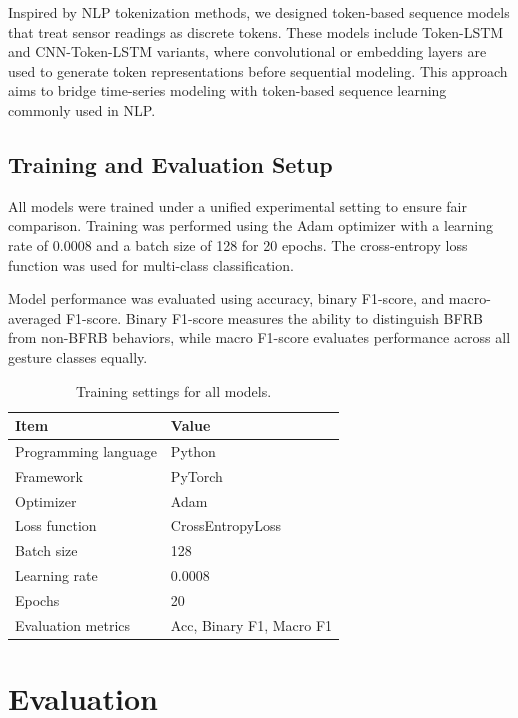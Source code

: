 \documentclass[conference]{IEEEtran}
\begin{document}
Inspired by NLP tokenization methods, we designed token-based sequence models that treat sensor readings as discrete tokens. These models include Token-LSTM and CNN-Token-LSTM variants, where convolutional or embedding layers are used to generate token representations before sequential modeling. This approach aims to bridge time-series modeling with token-based sequence learning commonly used in NLP.

\subsection{Training and Evaluation Setup}

All models were trained under a unified experimental setting to ensure fair comparison. Training was performed using the Adam optimizer with a learning rate of 0.0008 and a batch size of 128 for 20 epochs. The cross-entropy loss function was used for multi-class classification.

Model performance was evaluated using accuracy, binary F1-score, and macro-averaged F1-score. Binary F1-score measures the ability to distinguish BFRB from non-BFRB behaviors, while macro F1-score evaluates performance across all gesture classes equally.

\begin{table}[t]
\caption{Training settings for all models.}
\label{tab:training_setting}
\centering
\begin{tabular}{ll}
\hline
Item & Value \\
\hline
Programming language & Python \\
Framework & PyTorch \cite{Ansel_PyTorch_2_Faster_2024} \\
Optimizer & Adam \\
Loss function & CrossEntropyLoss \\
Batch size & 128 \\
Learning rate & 0.0008 \\
Epochs & 20 \\
Evaluation metrics & Acc, Binary F1, Macro F1 \cite{scikit-learn} \\
\hline
\end{tabular}
\end{table}



\clearpage
\section{Evaluation}
\end{document}
